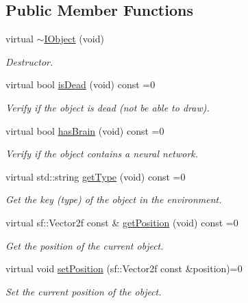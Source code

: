 \subsection*{Public Member Functions}
\begin{DoxyCompactItemize}
\item 
\hypertarget{class_graphics_1_1_i_object_a754738cfd4e41113f438a3e0fbed8e08}{}virtual \hyperlink{class_graphics_1_1_i_object_a754738cfd4e41113f438a3e0fbed8e08}{$\sim$\+I\+Object} (void)\label{class_graphics_1_1_i_object_a754738cfd4e41113f438a3e0fbed8e08}

\begin{DoxyCompactList}\small\item\em Destructor. \end{DoxyCompactList}\item 
virtual bool \hyperlink{class_graphics_1_1_i_object_a8efbdb791e3a99d697e5c74a1531d2c8}{is\+Dead} (void) const  =0
\begin{DoxyCompactList}\small\item\em Verify if the object is dead (not be able to draw). \end{DoxyCompactList}\item 
virtual bool \hyperlink{class_graphics_1_1_i_object_a2915106368247427dcff04c5eec2190c}{has\+Brain} (void) const  =0
\begin{DoxyCompactList}\small\item\em Verify if the object contains a neural network. \end{DoxyCompactList}\item 
virtual std\+::string \hyperlink{class_graphics_1_1_i_object_a9ca3ca5527c0c565d06396efe80ba243}{get\+Type} (void) const  =0
\begin{DoxyCompactList}\small\item\em Get the key (type) of the object in the environment. \end{DoxyCompactList}\item 
virtual sf\+::\+Vector2f const \& \hyperlink{class_graphics_1_1_i_object_a273d70f469dc4cda00cb19cd6b65395a}{get\+Position} (void) const  =0
\begin{DoxyCompactList}\small\item\em Get the position of the current object. \end{DoxyCompactList}\item 
virtual void \hyperlink{class_graphics_1_1_i_object_acb10bc8924396f1e9a8aa510e96ec0c2}{set\+Position} (sf\+::\+Vector2f const \&position)=0
\begin{DoxyCompactList}\small\item\em Set the current position of the object. \end{DoxyCompactList}\item 

\end{DoxyCompactItemize}
